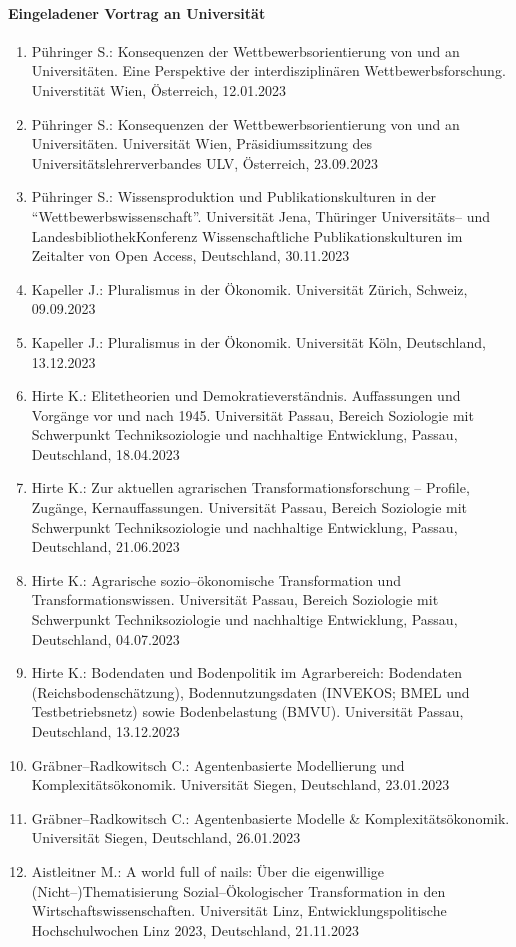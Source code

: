 \paragraph{Eingeladener Vortrag an Universität}
\begin{enumerate}
	\item Pühringer S.: Konsequenzen der Wettbewerbsorientierung von und an Universitäten. Eine Perspektive der interdisziplinären Wettbewerbsforschung. Universtität Wien, Österreich, 12.01.2023
	\item Pühringer S.: Konsequenzen der Wettbewerbsorientierung von und an Universitäten. Universität Wien, Präsidiumssitzung des Universitätslehrerverbandes ULV, Österreich, 23.09.2023
	\item Pühringer S.: Wissensproduktion und Publikationskulturen in der “Wettbewerbswissenschaft”. Universität Jena, Thüringer Universitäts-- und LandesbibliothekKonferenz Wissenschaftliche Publikationskulturen im Zeitalter von Open Access, Deutschland, 30.11.2023
	\item Kapeller J.: Pluralismus in der Ökonomik. Universität Zürich, Schweiz, 09.09.2023
	\item Kapeller J.: Pluralismus in der Ökonomik. Universität Köln, Deutschland, 13.12.2023
	\item Hirte K.: Elitetheorien und Demokratieverständnis. Auffassungen und Vorgänge vor und nach 1945. Universität Passau, Bereich Soziologie mit Schwerpunkt Techniksoziologie und nachhaltige Entwicklung, Passau, Deutschland, 18.04.2023
	\item Hirte K.: Zur aktuellen agrarischen Transformationsforschung – Profile, Zugänge, Kernauffassungen. Universität Passau, Bereich Soziologie mit Schwerpunkt Techniksoziologie und nachhaltige Entwicklung, Passau, Deutschland, 21.06.2023
	\item Hirte K.: Agrarische sozio--ökonomische Transformation und Transformationswissen. Universität Passau, Bereich Soziologie mit Schwerpunkt Techniksoziologie und nachhaltige Entwicklung, Passau, Deutschland, 04.07.2023
	\item Hirte K.: Bodendaten und Bodenpolitik im Agrarbereich: Bodendaten (Reichsbodenschätzung), Bodennutzungsdaten (INVEKOS; BMEL und Testbetriebsnetz) sowie Bodenbelastung (BMVU). Universität Passau, Deutschland, 13.12.2023
	\item Gräbner--Radkowitsch C.: Agentenbasierte Modellierung und Komplexitätsökonomik. Universität Siegen, Deutschland, 23.01.2023
	\item Gräbner--Radkowitsch C.: Agentenbasierte Modelle \& Komplexitätsökonomik. Universität Siegen, Deutschland, 26.01.2023
	\item Aistleitner M.: A world full of nails: Über die eigenwillige (Nicht--)Thematisierung Sozial--Ökologischer Transformation in den Wirtschaftswissenschaften. Universität Linz, Entwicklungspolitische Hochschulwochen Linz 2023, Deutschland, 21.11.2023
\end{enumerate}

